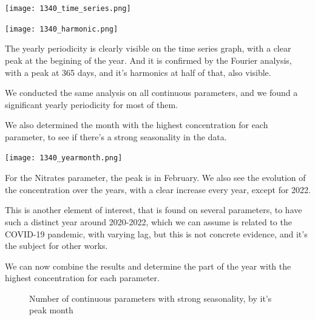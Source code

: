 \documentclass{article}
\begin{document}
\centerline{\texttt{[image: 1340\_time\_series.png]}}
\vspace{1em}
\centerline{\texttt{[image: 1340\_harmonic.png]}}

The yearly periodicity is clearly visible on the time series graph, with a clear peak at the begining of the year. And it is confirmed by the Fourier analysis, with a peak at 365 days, and it's harmonics at half of that, also visible.

We conducted the same analysis on all continuous parameters, and we found a significant yearly periodicity for most of them.

\newpage
We also determined the month with the highest concentration for each parameter, to see if there's a strong seasonality in the data.

\centerline{\texttt{[image: 1340\_yearmonth.png]}}

For the Nitrates parameter, the peak is in February.
We also see the evolution of the concentration over the years, with a clear increase every year, except for 2022.

This is another element of interest, that is found on several parameters, to have such a distinct year around 2020-2022, which we can assume is related to the COVID-19 pandemic, with varying lag, but this is not concrete evidence, and it's the subject for other works.


\newpage
We can now combine the results and determine the part of the year with the highest concentration for each parameter.


\begin{figure}[H]
    \centering
    \caption{Number of continuous parameters with strong seasonality, by it's peak month}
\end{figure}
\end{document}
